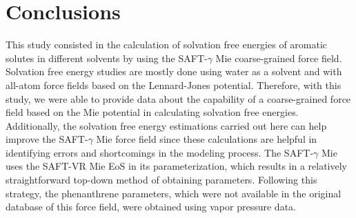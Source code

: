 \documentclass[final,12p,times,twocolumn]{elsarticle}
\begin{document}
	\section{Conclusions}
	This study consisted in the calculation of solvation free energies of aromatic solutes in different solvents by using the SAFT-$\gamma$ Mie coarse-grained force field. Solvation free energy studies are mostly done using water as a solvent and with all-atom force fields based on the Lennard-Jones potential. Therefore, with this study, we were able to provide data about the capability of a coarse-grained force field based on the Mie potential in calculating solvation free energies. Additionally, the solvation free energy estimations carried out here can help improve the SAFT-$\gamma$  Mie force field since these calculations are helpful in identifying errors and shortcomings in the modeling process. The SAFT-$\gamma$ Mie uses the SAFT-VR Mie EoS in its parameterization, which results in a relatively straightforward top-down method of obtaining parameters. Following this strategy, the phenanthrene parameters, which were not available in the original database of this force field, were obtained using vapor pressure data.
	
\end{document}
